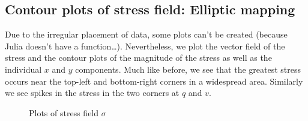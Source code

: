 \documentclass{article}
\numberwithin{equation}{section}
\theoremstyle{definition}
\begin{document}
\subsection{Contour plots of stress field: Elliptic mapping}
Due to the irregular placement of data, some plots can't be created (because Julia doesn't have a  function\dots). Nevertheless, we plot the vector field of the stress and the contour plots of the magnitude of the stress as well as the individual $x$ and $y$ components. Much like before, we see that the greatest stress occurs near the top-left and bottom-right corners in a widespread area. Similarly we see spikes in the stress in the two corners at $q$ and $v$.

\begin{figure}[H]
    \centering
    \hfill
    \hfill
    \caption{Plots of stress field $\sigma$}
    \label{fig:fig16}
\end{figure}
\end{document}
